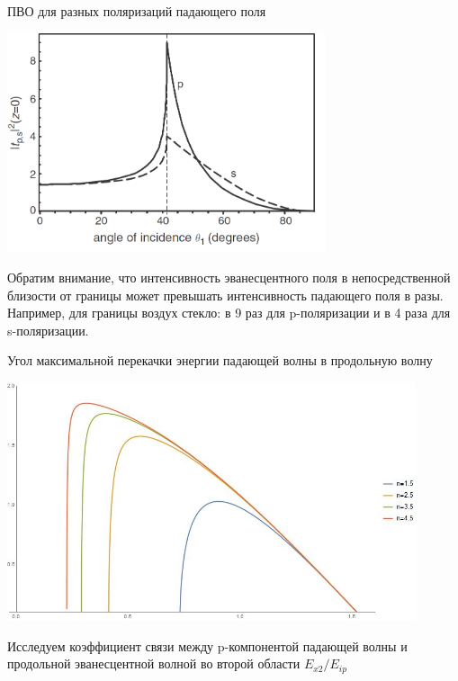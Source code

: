 \documentclass[9pt, compress, xcolor=table]{beamer}
\begin{document}
\begin{frame}{ПВО для разных поляризаций падающего поля}
\begin{center}
\includegraphics[width=0.7\textwidth]{ftir}
\end{center}

Обратим внимание, что интенсивность эванесцентного поля в непосредственной близости от границы может превышать интенсивность падающего поля в разы. Например, для границы воздух стекло: в 9 раз для p-поляризации и в 4 раза для s-поляризации.

\end{frame}

\begin{frame}{Угол максимальной перекачки энергии }
падающей волны в продольную волну
\begin{center}
\includegraphics[width=0.9\textwidth]{fig.jpg}
\end{center}

Исследуем коэффициент связи между p-компонентой падающей волны и продольной эванесцентной волной во второй области $E_{x2}/E_{ip}$

\end{frame}
\end{document}
